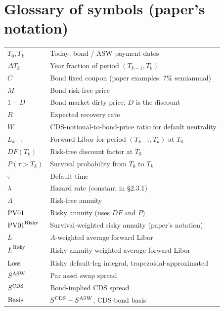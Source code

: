 \documentclass[11pt,a4paper]{article}
\begin{document}
\section{Glossary of symbols (paper's notation)}
\begin{tabular}{@{}p{3cm}p{12cm}@{}}
\toprule
$T_0, T_k$        & Today; bond / ASW payment dates \\
$\Delta T_k$      & Year fraction of period $(T_{k-1}, T_k)$ \\
$C$               & Bond fixed coupon (paper examples: 7\% semiannual) \\
$M$               & Bond risk-free price \\
$1 - D$           & Bond market dirty price; $D$ is the discount \\
$R$               & Expected recovery rate \\
$W$               & CDS-notional-to-bond-price ratio for default neutrality \\
$L_{k-1}$         & Forward Libor for period $(T_{k-1}, T_k)$ at $T_0$ \\
$DF(T_k)$         & Risk-free discount factor at $T_0$ \\
$P(\tau > T_k)$   & Survival probability from $T_0$ to $T_k$ \\
$\tau$            & Default time \\
$\lambda$         & Hazard rate (constant in \S2.3.1) \\
$A$               & Risk-free annuity \\
$\mathrm{PV01}$          & Risky annuity (uses $DF$ and $P$) \\
$\mathrm{PV01}^{\text{Risky}}$ & Survival-weighted risky annuity (paper's notation) \\
$\overline L$     & $A$-weighted average forward Libor \\
$\overline L^{\,\text{Risky}}$ & Risky-annuity-weighted average forward Libor \\
$\mathrm{Loss}$           & Risky default-leg integral, trapezoidal-approximated \\
$S^{\mathrm{ASW}}$           & Par asset swap spread \\
$S^{\mathrm{CDS}}$           & Bond-implied CDS spread \\
$\mathrm{Basis}$          & $S^{\mathrm{CDS}} - S^{\mathrm{ASW}}$, CDS-bond basis \\
\bottomrule
\end{tabular}
\end{document}
